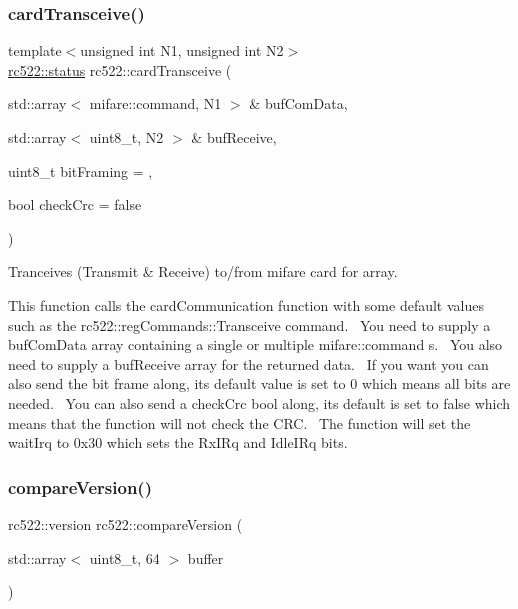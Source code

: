 \subsubsection{\texorpdfstring{card\+Transceive()}{cardTransceive()}\hspace{0.1cm}{\footnotesize\ttfamily [2/2]}}
{\footnotesize\ttfamily template$<$unsigned int N1, unsigned int N2$>$ \\
\hyperlink{classspiReader_a4bcf984823c38cf4841ebf619e788790}{rc522\+::status} rc522\+::card\+Transceive (\begin{DoxyParamCaption}\item[{std\+::array$<$ mifare\+::command, N1 $>$ \&}]{buf\+Com\+Data,  }\item[{std\+::array$<$ uint8\+\_\+t, N2 $>$ \&}]{buf\+Receive,  }\item[{uint8\+\_\+t}]{bit\+Framing = {},  }\item[{bool}]{check\+Crc = {\ttfamily false} }\end{DoxyParamCaption})\hspace{0.3cm}{\ttfamily [inline]}}



Tranceives (Transmit \& Receive) to/from mifare card for array. 

This function calls the card\+Communication function with some default values such as the rc522\+::reg\+Commands\+::\+Transceive command.~\newline
You need to supply a buf\+Com\+Data array containing a single or multiple mifare\+::command \textquotesingle{}s.~\newline
You also need to supply a buf\+Receive array for the returned data.~\newline
If you want you can also send the bit frame along, its default value is set to 0 which means all bits are needed.~\newline
You can also send a check\+Crc bool along, its default is set to false which means that the function will not check the C\+RC.~\newline
The function will set the wait\+Irq to 0x30 which sets the Rx\+I\+Rq and Idle\+I\+Rq bits. \mbox{\label{classrc522_a144c7bf4db9385aaa345c40f36ec929c}} 
\subsubsection{\texorpdfstring{compare\+Version()}{compareVersion()}}
{\footnotesize\ttfamily rc522\+::version rc522\+::compare\+Version (\begin{DoxyParamCaption}\item[{std\+::array$<$ uint8\+\_\+t, 64 $>$}]{buffer }\end{DoxyParamCaption})}



